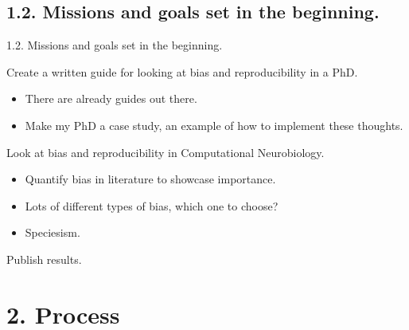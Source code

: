 \documentclass[t]{beamer}
\begin{document}
\subsection{1.2. Missions and goals set in the beginning.}
\begin{frame}{1.2. Missions and goals set in the beginning.}
	\begin{block}{Create a written guide for looking at bias and reproducibility in a PhD.}
  		\begin{itemize}    
  			\item There are already guides out there.
  			\item Make my PhD a case study, an example of how to implement these thoughts. 
  		\end{itemize}    
	\end{block}
 
	\begin{block}{Look at bias and reproducibility in Computational Neurobiology.}
  		\begin{itemize}    
  			\item Quantify bias in literature to showcase importance.
  			\item Lots of different types of bias, which one to choose? 
                \item Speciesism.
  		\end{itemize}    
	\end{block}
        \begin{block}{Publish results.}   
	\end{block}
\end{frame}

\section{2. Process}
\end{document}

